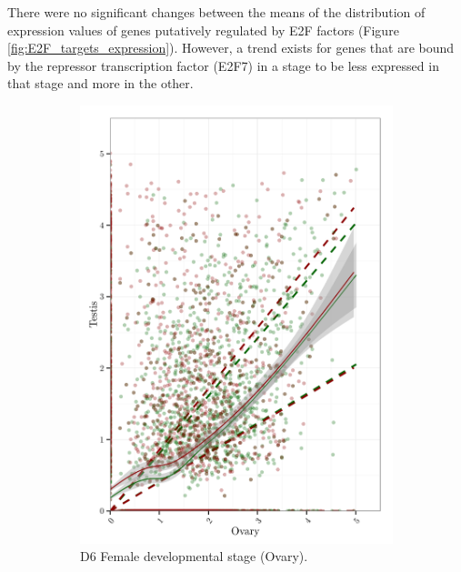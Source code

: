 \documentclass[11pt,twoside,a4paper]{report}
\begin{document}
    	There were no significant changes between the means of the distribution of expression values of genes putatively regulated by E2F factors (Figure \ref{fig:E2F_targets_expression}).	However, a trend exists for genes that are bound by the repressor transcription factor (E2F7) in a stage to be less expressed in that stage and more in the other.
		
		\begin{figure}
			\centering
			\begin{subfigure}{.5\textwidth}
				\centering
				\includegraphics[width=1\linewidth]{pngs/E2F_specific_Female_expression.png}
				\caption{D6 Female developmental stage (Ovary).}
			\end{subfigure}%
			\begin{subfigure}{.5\textwidth}
				\centering

\end{subfigure}
\end{figure}
\end{document}
